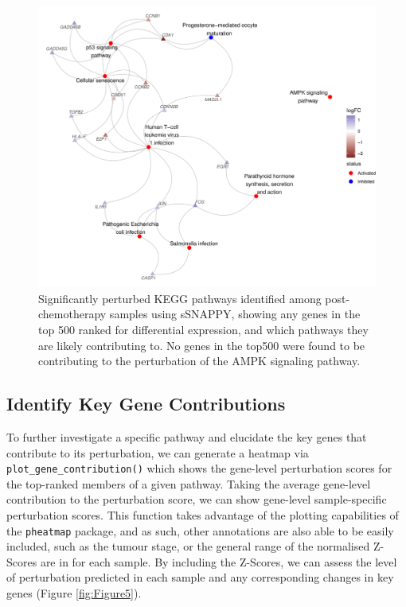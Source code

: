 \documentclass[9pt,a4paper,]{extarticle}
\begin{document}
\begin{figure}

{\centering \includegraphics[width=0.8\linewidth]{sSNAPPY_paper_files/figure-latex/Figure4-1} 

}

\caption{Significantly perturbed KEGG pathways identified among post-chemotherapy samples using sSNAPPY, showing any genes in the top 500 ranked for differential expression, and which pathways they are likely contributing to. No genes in the top500 were found to be contributing to the perturbation of the AMPK signaling pathway.}\label{fig:Figure4}
\end{figure}

\hypertarget{identify-key-gene-contributions}{%
\subsection{Identify Key Gene Contributions}\label{identify-key-gene-contributions}}

To further investigate a specific pathway and elucidate the key genes that contribute to its perturbation, we can generate a heatmap via \texttt{plot\_gene\_contribution()} which shows the gene-level perturbation scores for the top-ranked members of a given pathway.
Taking the average gene-level contribution to the perturbation score, we can show gene-level sample-specific perturbation scores.
This function takes advantage of the plotting capabilities of the \texttt{pheatmap} package\citep{pheatmap}, and as such, other annotations are also able to be easily included, such as the tumour stage, or the general range of the normalised Z-Scores are in for each sample.
By including the Z-Scores, we can assess the level of perturbation predicted in each sample and any corresponding changes in key genes (Figure \ref{fig:Figure5}).
\end{document}

